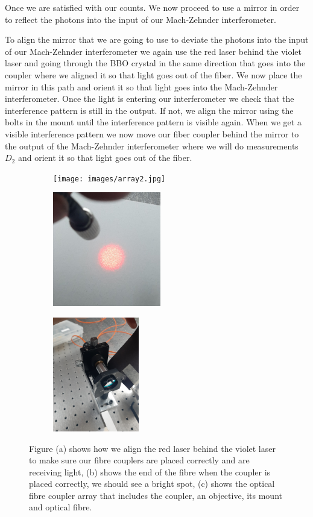 \documentclass[12pt]{book}
\begin{document}
Once we are satisfied with our counts. We now proceed to use a mirror in order to reflect the photons into the input of our Mach-Zehnder interferometer.


To align the mirror that we are going to use to deviate the photons into the input of our Mach-Zehnder interferometer we again use the red laser behind the violet laser and going through the BBO crystal in the same direction that goes into the coupler where we aligned it so that light goes out of the fiber. We now place the mirror in this path and orient it so that light goes into the Mach-Zehnder interferometer. Once the light is entering our interferometer we check that the interference pattern is still in the output. If not, we align the mirror using the bolts in the mount until the interference pattern is visible again. When we get a visible interference pattern we now move our fiber coupler behind the mirror to the output of the Mach-Zehnder interferometer where we will do measurements $D_{2}$ and orient it so that light goes out of the fiber. 



\begin{figure}[t!]
\centering
\begin{subfigure}[b]{0.3\linewidth}
\texttt{[image: images/array2.jpg]}
\caption{}
\end{subfigure}
\begin{subfigure}[b]{0.3\linewidth}
\includegraphics[width=\linewidth,height=5cm]{images/outfibre.jpg}
\caption{}
\end{subfigure}
\begin{subfigure}[b]{0.3\linewidth}
\includegraphics[width=\linewidth,height=5cm]{images/fibre.jpg}
\caption{}
\end{subfigure}
\caption{Figure (a) shows how we align the red laser behind the violet laser to make sure our fibre couplers are placed correctly and are receiving light, (b) shows the end of the fibre when the coupler is placed correctly, we should see a bright spot, (c) shows the optical fibre coupler array that includes the coupler, an objective, its mount and optical fibre.}
\label{fig:coupler}
\end{figure}
\end{document}
